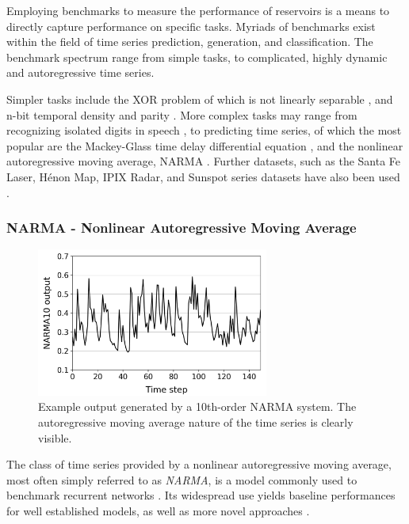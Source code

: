 Employing benchmarks to measure the performance of reservoirs is a means to
directly capture performance on specific tasks. Myriads of benchmarks exist
within the field of time series prediction, generation, and classification. The
benchmark spectrum range from simple tasks, to complicated, highly dynamic and
autoregressive time series.

Simpler tasks include the XOR problem of which is not linearly separable
\cite{goos_pattern_2003}, and n-bit temporal density and parity
\cite{bertschinger_real-time_2004}. More complex tasks may range from
recognizing isolated digits in speech \cite{verstraeten_isolated_2005}, to
predicting time series, of which the most popular are the Mackey-Glass time
delay differential equation \cite{mackey_oscillation_1977}, and the nonlinear
autoregressive moving average, NARMA \cite{atiya_new_2000}. Further datasets,
such as the Santa Fe Laser, Hénon Map, IPIX Radar, and Sunspot series datasets
have also been used \cite{rodan_minimum_2011}.

\subsubsection{NARMA - Nonlinear Autoregressive Moving Average}

\begin{figure}[t!]
  \centering
  \includegraphics[width=3.0in]{figures/NARMA10.png}
  \caption{
    Example output generated by a 10th-order NARMA system. The autoregressive
moving average nature of the time series is clearly visible.
  }
  \label{fig:narma10}
\end{figure}

The class of time series provided by a nonlinear autoregressive moving average,
most often simply referred to as \textit{NARMA}, is a model commonly used to
benchmark recurrent networks \cite{atiya_new_2000}. Its widespread use yields
baseline performances for well established models, as well as more novel
approaches \cite{verstraeten_experimental_2007, appeltant_information_2011}.

